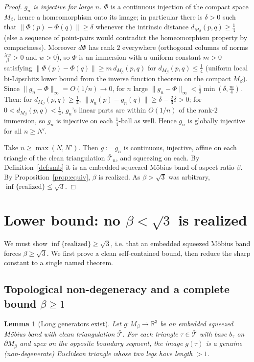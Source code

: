 \documentclass[11pt]{article}
\newtheorem{lemma}{Lemma}
\theoremstyle{definition}
\newcommand{\R}{\mathbb{R}}
\newcommand{\bd}{\partial}
\newcommand{\norm}[1]{\lVert #1 \rVert}
\begin{document}
\begin{proof}
\emph{$g_n$ is injective for large $n$.} $\Phi$ is a continuous injection of the compact
space $M_\beta$, hence a homeomorphism onto its image; in particular there is $\delta>0$ such
that $\norm{\Phi(p)-\Phi(q)}\ge\delta$ whenever the intrinsic distance
$d_{M_\beta}(p,q)\ge\tfrac1{4}$ (else a sequence of point-pairs would contradict the
homeomorphism property by compactness). Moreover $d\Phi$ has rank $2$ everywhere (orthogonal
columns of norms $\tfrac{\lambda w}{\beta}>0$ and $w>0$), so $\Phi$ is an immersion with a
uniform constant $m>0$ satisfying $\norm{\Phi(p)-\Phi(q)}\ge m\,d_{M_\beta}(p,q)$ for
$d_{M_\beta}(p,q)\le\tfrac14$ (uniform local bi-Lipschitz lower bound from the inverse
function theorem on the compact $M_\beta$). Since $\norm{g_n-\Phi}_\infty=O(1/n)\to0$, for $n$
large $\norm{g_n-\Phi}_\infty<\tfrac13\min(\delta,\tfrac{m}{4})$. Then: for
$d_{M_\beta}(p,q)\ge\tfrac14$, $\norm{g_n(p)-g_n(q)}\ge\delta-\tfrac{2}{3}\delta>0$; for
$0<d_{M_\beta}(p,q)<\tfrac14$, $g_n$'s linear parts are within $O(1/n)$ of the rank-$2$
immersion, so $g_n$ is injective on each $\tfrac14$-ball as well. Hence $g_n$ is globally
injective for all $n\ge N'$.

Take $n\ge\max(N,N')$. Then $g:=g_n$ is continuous, injective, affine on each triangle of
the clean triangulation $\bar{\mathcal T}_n$, and squeezing on each. By
Definition~\ref{def:smb} it is an embedded squeezed M\"obius band of aspect ratio $\beta$.
By Proposition~\ref{prop:equiv}, $\beta$ is realized. As $\beta>\sqrt3$ was arbitrary,
$\inf\{\text{realized}\}\le\sqrt3$.
\end{proof}

\section{Lower bound: no $\beta<\sqrt3$ is realized}\label{sec:lower}

We must show $\inf\{\text{realized}\}\ge\sqrt3$, i.e. that an embedded squeezed M\"obius band
forces $\beta\ge\sqrt3$. We first prove a clean self-contained bound, then reduce the sharp
constant to a single named theorem.

\subsection{Topological non-degeneracy and a complete bound $\beta\ge1$}

\begin{lemma}[Long generators exist]\label{lem:gen}
Let $g:M_\beta\to\R^3$ be an embedded squeezed M\"obius band with clean triangulation
$\bar{\mathcal T}$. For each triangle $\tau\in\bar{\mathcal T}$ with base $b_\tau$ on
$\bd M_\beta$ and apex on the opposite boundary segment, the image $g(\tau)$ is a genuine
(non-degenerate) Euclidean triangle whose two legs have length $>1$.
\end{lemma}
\end{document}
